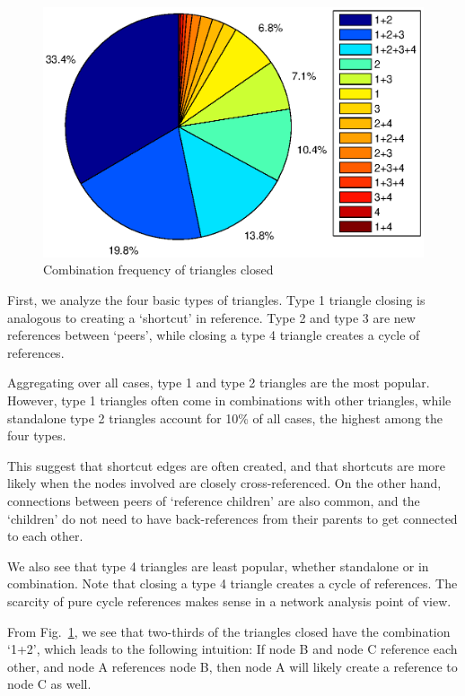 \documentclass[10pt,twocolumn]{article}
\begin{document}
\begin{figure}[t]
    \centering
    \includegraphics[scale=0.45, trim = 6cm 1cm 0cm 0cm]{./graphs/15_tri.eps}
    \caption{Combination frequency of triangles closed} \label{fig:combo15}
\end{figure}

First, we analyze the four basic types of triangles. Type 1 triangle closing is analogous to creating a `shortcut' in reference. Type 2 and type 3 are new references between `peers', while closing a type 4 triangle creates a cycle of references. 

Aggregating over all cases, type 1 and type 2 triangles are the most popular. However, type 1 triangles often come in combinations with other triangles, while standalone type 2 triangles account for 10\% of all cases, the highest among the four types.

This suggest that shortcut edges are often created, and that shortcuts are more likely when the nodes involved are closely cross-referenced. On the other hand, connections between peers of `reference children' are also common, and the `children' do not need to have back-references from their parents to get connected to each other.

We also see that type 4 triangles are least popular, whether standalone or in combination. Note that closing a type 4 triangle creates a cycle of references. The scarcity of pure cycle references makes sense in a network analysis point of view.

From Fig.~\ref{fig:combo15}, we see that two-thirds of the triangles closed have the combination `1+2', which leads to the following intuition: If node B and node C reference each other, and node A references node B, then node A will likely create a reference to node C as well.
\end{document}
